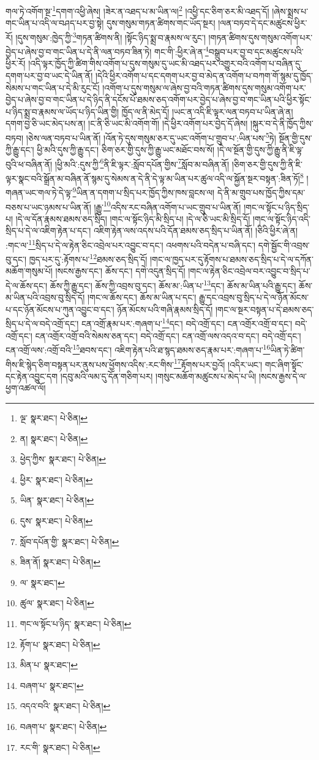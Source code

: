 གལ་ཏེ་འགོག་སྔ་\footnote{ལྔ་  སྣར་ཐང་།  པེ་ཅིན། }དགག་འཕྱི་ཞེས། །ཟེར་ན་འཐད་པ་མ་ཡིན་ལ།\footnote{ན།  སྣར་ཐང་།  པེ་ཅིན། } །འཕྱི་དང་ཅིག་ཅར་མི་འཐད་དོ། །ཞེས་སྨྲས་པ་གང་ཡིན་པ་འདི་ལ་བཤད་པར་བྱ་སྟེ། དུས་གསུམ་གཏན་ཚིགས་གང་ཡོད་སྔར། །ལན་བཏབ་དེ་དང་མཚུངས་ཕྱིར་རོ། །དུས་གསུམ་:ཁྱེད་ཀྱི་\footnote{ཕྱེད་ཀྱིས་  སྣར་ཐང་།  པེ་ཅིན། }གཏན་ཚིགས་ནི། །སྟོང་ཉིད་སྨྲ་བ་རྣམས་ལ་རུང་། །གཏན་ཚིགས་དུས་གསུམ་འགོག་པར་བྱེད་པ་ཞེས་བྱ་བ་གང་ཡིན་པ་དེ་ནི་ལན་བཏབ་ཟིན་ཏེ། གང་གི་:ཕྱིར་ཞེ་ན་\footnote{ཕྱིར་  སྣར་ཐང་།  པེ་ཅིན། }བསྒྲུབ་པར་བྱ་བ་དང་མཚུངས་པའི་ཕྱིར་རོ། །འདི་ལྟར་ཁྱོད་ཀྱི་ཚིག་གིས་འགོག་པ་དུས་གསུམ་དུ་ཡང་མི་འཐད་པར་འགྱུར་བའི་འགོག་པ་བཞིན་དུ་དགག་པར་བྱ་བ་ཡང་དེ་ཡིན་ནོ། །དེའི་ཕྱིར་འགོག་པ་དང་དགག་པར་བྱ་བ་མེད་ན་འགོག་པ་བཀག་གོ་སྙམ་དུ་ཁྱོད་སེམས་པ་གང་ཡིན་པ་དེ་མི་རུང་ངོ། །འགོག་པ་དུས་གསུམ་ལ་ཞེས་བྱ་བའི་གཏན་ཚིགས་དུས་གསུམ་འགོག་པར་བྱེད་པ་ཞེས་བྱ་བ་གང་ཡིན་པ་དེ་ཉིད་ནི་དངོས་པོ་ཐམས་ཅད་འགོག་པར་བྱེད་པ་ཞེས་བྱ་བ་གང་ཡིན་པའི་ཕྱིར་སྟོང་པ་ཉིད་སྨྲ་བ་རྣམས་ལ་ཡོད་པ་ཉིད་ཡིན་གྱི། ཁྱོད་ལ་ནི་མེད་དོ། །ཡང་ན་འདི་ཇི་ལྟར་ལན་བཏབ་པ་ཡིན་ཞེ་ན། དགག་བྱ་ཅི་ཡང་མེད་པས་ན། །ང་ནི་ཅི་ཡང་མི་འགོག་གོ། །དེ་ཕྱིར་འགོག་པར་བྱེད་དོ་ཞེས། །སྐུར་བ་དེ་ནི་ཁྱོད་ཀྱིས་བཏབ། །ཅེས་ལན་བཏབ་པ་ཡིན་ནོ། །འོན་ཏེ་དུས་གསུམ་ཅར་དུ་ཡང་འགོག་པ་གྲུབ་པ་:ཡིན་པས་\footnote{ཡིན་  སྣར་ཐང་།  པེ་ཅིན། }ཏེ། སྔོན་གྱི་དུས་ཀྱི་རྒྱུ་དང་། ཕྱི་མའི་དུས་ཀྱི་རྒྱུ་དང་། ཅིག་ཅར་གྱི་དུས་ཀྱི་རྒྱུ་ཡང་མཐོང་བས་སོ། །དེ་ལ་སྔོན་གྱི་དུས་ཀྱི་རྒྱུ་ནི་ཇི་ལྟ་བུའི་ཕ་བཞིན་ནོ། །ཕྱི་མའི་:དུས་ཀྱི་\footnote{དུས་  སྣར་ཐང་།  པེ་ཅིན། }ནི་ཇི་ལྟར་:སློབ་དཔོན་གྱིས་\footnote{སློབ་དཔོན་གྱི་  སྣར་ཐང་།  པེ་ཅིན། }སློབ་མ་བཞིན་ནོ། །ཅིག་ཅར་གྱི་དུས་ཀྱི་ནི་ཇི་ལྟར་སྣང་བའི་སྒྲོན་མ་བཞིན་ནོ་སྙམ་དུ་སེམས་ན་དེ་ནི་དེ་ལྟ་མ་ཡིན་པར་ཚུལ་འདི་ལ་སྐྱོན་སྔར་བསྟན་:ཟིན་ཏོ།\footnote{ཟིན་ནོ།  སྣར་ཐང་།  པེ་ཅིན། } །གཞན་ཡང་གལ་ཏེ་དེ་ལྟ་\footnote{ལ་  སྣར་ཐང་། }ཡིན་ན་དགག་པ་སྲིད་པར་ཁྱོད་ཀྱིས་ཁས་བླངས་ལ། དེ་ནི་མ་གྲུབ་པས་ཁྱོད་ཀྱིས་དམ་བཅས་པ་ཡང་ཉམས་པ་ཡིན་ནོ། །རྒྱུ་\footnote{ཚུལ་  སྣར་ཐང་།  པེ་ཅིན། }འདིས་རང་བཞིན་འགོག་པ་ཡང་གྲུབ་པ་ཡིན་ནོ། །གང་ལ་སྟོང་པ་ཉིད་སྲིད་པ། །དེ་ལ་དོན་རྣམས་ཐམས་ཅད་སྲིད། །གང་ལ་སྟོང་ཉིད་མི་སྲིད་པ། །དེ་ལ་ཅི་ཡང་མི་སྲིད་དོ། །གང་ལ་སྟོང་ཉིད་འདི་སྲིད་པ་དེ་ལ་འཇིག་རྟེན་པ་དང་། འཇིག་རྟེན་ལས་འདས་པའི་དོན་ཐམས་ཅད་སྲིད་པ་ཡིན་ནོ། །ཅིའི་ཕྱིར་ཞེ་ན། :གང་ལ་\footnote{གང་ལ་སྟོང་པ་ཉིད་  སྣར་ཐང་།  པེ་ཅིན། }སྲིད་པ་དེ་ལ་རྟེན་ཅིང་འབྲེལ་པར་འབྱུང་བ་དང་། འཕགས་པའི་བདེན་པ་བཞི་དང་། དགེ་སྦྱོང་གི་འབྲས་བུ་དང་། ཁྱད་པར་དུ་:རྟོགས་པ་\footnote{རྟོག་པ་  སྣར་ཐང་།  པེ་ཅིན། }ཐམས་ཅད་སྲིད་དོ། །གང་ལ་ཁྱད་པར་དུ་རྟོགས་པ་ཐམས་ཅད་སྲིད་པ་དེ་ལ་དཀོན་མཆོག་གསུམ་པོ། །སངས་རྒྱས་དང་། ཆོས་དང་། དགེ་འདུན་སྲིད་དོ། །གང་ལ་རྟེན་ཅིང་འབྲེལ་བར་འབྱུང་བ་སྲིད་པ་དེ་ལ་ཆོས་དང་། ཆོས་ཀྱི་རྒྱུ་དང་། ཆོས་ཀྱི་འབྲས་བུ་དང་། ཆོས་མ་:ཡིན་པ་\footnote{མིན་པ་  སྣར་ཐང་། }དང་། ཆོས་མ་ཡིན་པའི་རྒྱུ་དང་། ཆོས་མ་ཡིན་པའི་འབྲས་བུ་སྲིད་དོ། །གང་ལ་ཆོས་དང་། ཆོས་མ་ཡིན་པ་དང་། རྒྱུ་དང་འབྲས་བུ་སྲིད་པ་དེ་ལ་ཉོན་མོངས་པ་དང་ཉོན་མོངས་པ་ཀུན་འབྱུང་བ་དང་། ཉོན་མོངས་པའི་གཞི་རྣམས་སྲིད་དོ། །གང་ལ་སྔར་བསྟན་པ་དེ་ཐམས་ཅད་སྲིད་པ་དེ་ལ་བདེ་འགྲོ་དང་། ངན་འགྲོ་རྣམ་པར་:གཞག་པ་\footnote{བཞག་པ་  སྣར་ཐང་། }དང་། བདེ་འགྲོ་དང་། ངན་འགྲོར་འགྲོ་བ་དང་། བདེ་འགྲོ་དང་། ངན་འགྲོར་འགྲོ་བའི་སེམས་ཅན་དང་། བདེ་འགྲོ་དང་། ངན་འགྲོ་ལས་འདའ་བ་དང་། བདེ་འགྲོ་དང་། ངན་འགྲོ་ལས་:འགྲོ་བའི་\footnote{འདའ་བའི་  སྣར་ཐང་།  པེ་ཅིན། }ཐབས་དང་། འཇིག་རྟེན་པའི་ཐ་སྙད་ཐམས་ཅད་རྣམ་པར་:གཞག་པ་\footnote{བཞག་པ་  སྣར་ཐང་།  པེ་ཅིན། }ཡིན་ཏེ་ཚིག་གིས་ཇི་སྙེད་ཅིག་བསྟན་པར་ནུས་པས་ཕྱོགས་འདིས་:རང་གིས་\footnote{རང་གི་  སྣར་ཐང་།  པེ་ཅིན། }རྟོགས་པར་བྱའོ། །འདིར་ཡང་། གང་ཞིག་སྟོང་དང་རྟེན་འབྱུང་དག །དབུ་མའི་ལམ་དུ་དོན་གཅིག་པར། །གསུང་མཆོག་མཚུངས་པ་མེད་པ་ཡི། །སངས་རྒྱས་དེ་ལ་ཕྱག་འཚལ་ལོ། 
